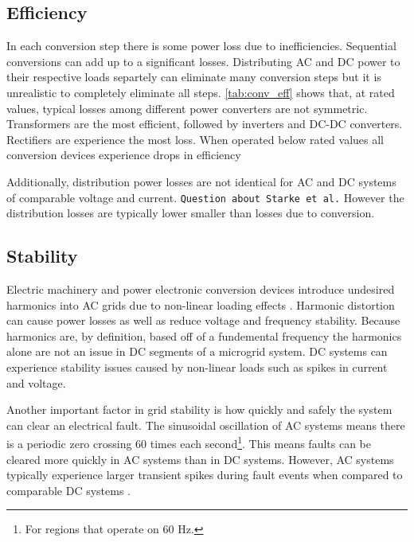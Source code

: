 \subsection{Efficiency}
In each conversion step there is some power loss due to inefficiencies. Sequential conversions can add up to a significant losses. Distributing AC and DC power to their respective loads separtely can eliminate many conversion steps but it is unrealistic to completely eliminate all steps. \autoref{tab:conv_eff} shows that, at rated values, typical losses among different power converters are not symmetric. Transformers are the most efficient, followed by inverters and DC-DC converters. Rectifiers are experience the most loss. When operated below rated values all conversion devices experience drops in efficiency

 

Additionally, distribution power losses are not identical for AC and DC systems of comparable voltage and current. 
\verb+Question about Starke et al.+
However the distribution losses are typically lower smaller than losses due to conversion.

\subsection{Stability}
Electric machinery and power electronic conversion devices introduce undesired harmonics into AC grids due to non-linear loading effects \cite{Grotzbach1997}. Harmonic distortion can cause power losses as well as reduce voltage and frequency stability. Because harmonics are, by definition, based off of a fundemental frequency the harmonics alone are not an issue in DC segments of a microgrid system. DC systems can experience stability issues caused by non-linear loads such as spikes in current and voltage.

Another important factor in grid stability is how quickly and safely the system can clear an electrical fault. The sinusoidal oscillation of AC systems means there is a periodic zero crossing 60 times each second\footnote{For regions that operate on 60 Hz.}. This means faults can be cleared more quickly in AC systems than in DC systems.  However, AC systems typically experience larger transient spikes during fault events when compared to comparable DC systems \cite{Estes2011}. 

